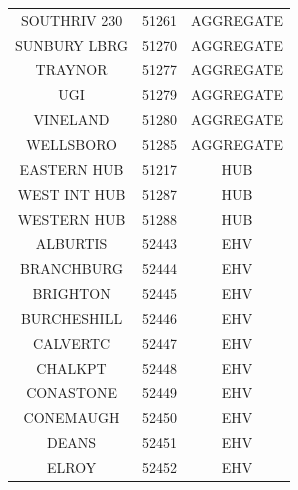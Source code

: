 \begin{table}[htb]
{\begin{tabular}{c c c}
SOUTHRIV 230 & 51261 & AGGREGATE \\
SUNBURY LBRG & 51270 & AGGREGATE \\
TRAYNOR & 51277 & AGGREGATE \\
UGI & 51279 & AGGREGATE \\
VINELAND & 51280 & AGGREGATE \\
WELLSBORO & 51285 & AGGREGATE \\
\cmidrule(lr){1-1} \cmidrule(lr){2-2} \cmidrule(lr){3-3}  
EASTERN HUB & 51217 & HUB \\
WEST INT HUB & 51287 & HUB \\
WESTERN HUB & 51288 & HUB \\
\cmidrule(lr){1-1} \cmidrule(lr){2-2} \cmidrule(lr){3-3}  	
ALBURTIS & 52443 & EHV \\
BRANCHBURG & 52444 & EHV \\
BRIGHTON & 52445 & EHV \\
BURCHESHILL & 52446 & EHV \\
CALVERTC & 52447 & EHV \\
CHALKPT & 52448 & EHV \\
CONASTONE & 52449 & EHV \\
CONEMAUGH & 52450 & EHV \\
DEANS & 52451 & EHV \\
ELROY & 52452 & EHV
	\\
\bottomrule
\end{tabular}}
\end{table}